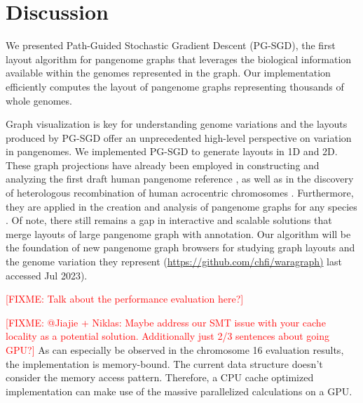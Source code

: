 \documentclass{bioinfo}
\theoremstyle{definition}
\newcommand{\red}[1]{{\textcolor{Red}{#1}}}
\newcommand{\FIXME}[1]{\red{[FIXME: #1]}}
\begin{document}
	\section{Discussion}
	\label{sec:discussion}
	
	We presented Path-Guided Stochastic Gradient Descent (PG-SGD), the first layout algorithm for pangenome graphs that leverages the biological information available within the genomes represented in the graph.
	Our implementation efficiently computes the layout of pangenome graphs representing thousands of whole genomes.
	
	Graph visualization is key for understanding genome variations and the layouts produced by PG-SGD offer an unprecedented high-level perspective on variation in pangenomes.
	We implemented PG-SGD to generate layouts in 1D and 2D.
	These graph projections have already been employed in constructing and analyzing the first draft human pangenome reference \citep{Liao2023}, as well as in the discovery of heterologous recombination of human acrocentric chromosomes \citep{Guarracino2023}.
	Furthermore, they are applied in the creation and analysis of pangenome graphs for any species \citep{Guarracino2022, Garrison2023}.
	Of note, there still remains a gap in interactive and scalable solutions that merge layouts of large pangenome graph with annotation.
	Our algorithm will be the foundation of new pangenome graph browsers for studying graph layouts and the genome variation they represent (\url{https://github.com/chfi/waragraph)} last accessed Jul 2023).
	
	\FIXME{Talk about the performance evaluation here?}
	
	\FIXME{@Jiajie + Niklas: Maybe address our SMT issue with your cache locality as a potential solution. Additionally just 2/3 sentences about going GPU?}
	As can especially be observed in the chromosome 16 evaluation results, the implementation is memory-bound. The current data structure doesn't consider the memory access pattern. Therefore, a CPU cache optimized implementation can make use of the massive parallelized calculations on a GPU.
\end{document}
